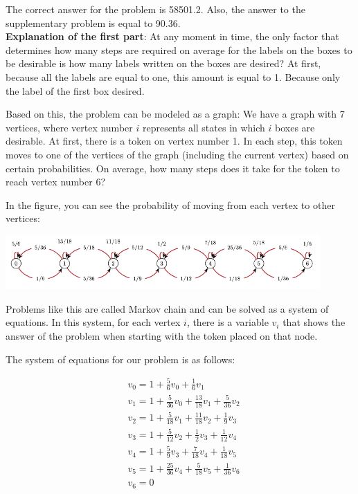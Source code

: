 \begin{solution}
The correct answer for the problem is 58501.2. Also, the answer to the supplementary problem is equal to 90.36.\\[0.2cm]

\textbf{Explanation of the first part}: At any moment in time, the only factor that determines how many steps are required on average for the labels on the boxes to be desirable is how many labels written on the boxes are desired? At first, because all the labels are equal to one, this amount is equal to 1. Because  only the label of the first box desired.

Based on this, the problem can be modeled as a graph:
We have a graph with 7 vertices, where vertex number $i$ represents all states in which $i$ boxes are desirable. At first, there is a token on vertex number  1. In each step, this token moves to one of the vertices of the graph (including the current vertex) based on certain probabilities. On average, how many steps does it take for the token to reach vertex number 6?

In the figure, you can see the probability of moving from each vertex to other vertices:

\begin{center}
	\includegraphics[width=12cm]{24/figs/24_diagram1.png}
\end{center}

Problems like this are called Markov chain and can be solved as a system of equations. In this system, for each vertex $i$, there is a variable $v_i$ that shows the answer of the problem when starting with the token placed on that node.

The system of equations for our problem is as follows:

$$
\begin{aligned}
&v_0 = 1 + \frac{5}{6}v_0 + \frac{1}{6}v_1 \\
&v_1 = 1 + \frac{5}{36}v_0 + \frac{13}{18}v_1 + \frac{5}{36}v_2 \\
&v_2 = 1 + \frac{5}{18}v_1 + \frac{11}{18}v_2 + \frac{1}{9}v_3 \\
&v_3 = 1 + \frac{5}{12}v_2 + \frac{1}{2}v_3 + \frac{1}{12}v_4 \\
&v_4 = 1 + \frac{5}{9}v_3 + \frac{7}{18}v_4 + \frac{1}{18}v_5 \\
&v_5 = 1 + \frac{25}{36}v_4 + \frac{5}{18}v_5 + \frac{1}{36}v_6 \\
&v_6 = 0
\end{aligned}
$$


\end{solution}
